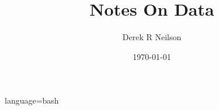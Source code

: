 \documentclass{article}
\title{Notes On Data}
\author{Derek R Neilson}
\date{\today}
\begin{document}
    language=bash        %
\end{document}
